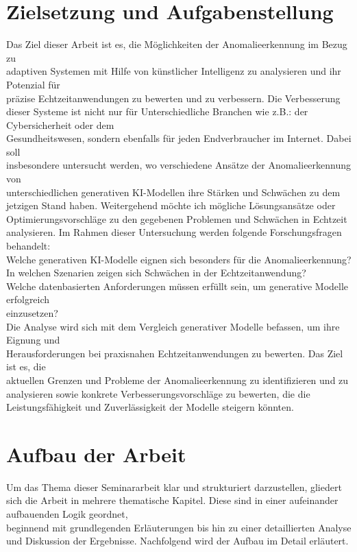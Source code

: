 \section{Zielsetzung und Aufgabenstellung}
Das Ziel dieser Arbeit ist es, die Möglichkeiten der Anomalieerkennung im Bezug zu \\ adaptiven Systemen mit Hilfe von künstlicher Intelligenz zu analysieren und ihr Potenzial für \\ präzise Echtzeitanwendungen zu bewerten und zu  verbessern. Die Verbesserung dieser Systeme ist nicht nur für Unterschiedliche Branchen wie z.B.: der Cybersicherheit oder dem \\ Gesundheitswesen, sondern ebenfalls für jeden Endverbraucher im Internet. Dabei soll \\ insbesondere untersucht werden, wo verschiedene Ansätze der Anomalieerkennung von \\ unterschiedlichen generativen KI-Modellen ihre Stärken und Schwächen zu dem jetzigen Stand haben. Weitergehend möchte ich mögliche Lösungsansätze oder Optimierungsvorschläge zu den gegebenen Problemen und Schwächen in Echtzeit analysieren. Im Rahmen dieser Untersuchung werden folgende Forschungsfragen behandelt: \\ Welche generativen KI-Modelle eignen sich besonders für die Anomalieerkennung? \\ In welchen Szenarien zeigen sich Schwächen in der Echtzeitanwendung?\\ Welche datenbasierten Anforderungen müssen erfüllt sein, um generative Modelle erfolgreich \\ 
einzusetzen?\\ Die Analyse wird sich mit dem Vergleich generativer Modelle befassen, um ihre Eignung und \\ Herausforderungen bei praxisnahen Echtzeitanwendungen zu bewerten. Das Ziel ist es, die \\ aktuellen Grenzen und Probleme der Anomalieerkennung zu identifizieren und zu analysieren sowie konkrete Verbesserungsvorschläge zu bewerten, die die Leistungsfähigkeit und Zuverlässigkeit der Modelle steigern könnten.
\newpage
   
\label{sec:einl_zielsetzung}
\section{Aufbau der Arbeit}
Um das Thema dieser Seminararbeit klar und strukturiert darzustellen, gliedert sich die Arbeit in mehrere thematische Kapitel. Diese sind in einer aufeinander aufbauenden Logik geordnet, \\ beginnend mit grundlegenden Erläuterungen bis hin zu einer detaillierten Analyse und Diskussion der Ergebnisse. Nachfolgend wird der Aufbau im Detail erläutert.\\
